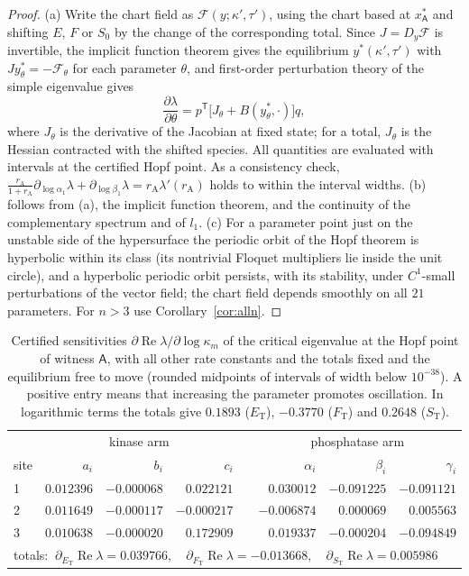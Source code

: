 \documentclass[11pt,a4paper]{article}
\theoremstyle{plain}
\theoremstyle{definition}
\theoremstyle{remark}
\newcommand{\T}{\mathsf T}
\newcommand{\ET}{E_{\mathrm T}}
\newcommand{\FT}{F_{\mathrm T}}
\newcommand{\ST}{S_{\mathrm T}}
\newcommand{\rA}{r_{\mathrm A}}
\newcommand{\WA}{\mathsf A}
\DeclareMathOperator{\Ree}{Re}
\begin{document}
\begin{proof}
(a) Write the chart field as $\mathcal F(y;\kappa',\tau')$, using the chart based at $x^*_{\WA}$ and shifting $E$, $F$ or $S_0$ by the change of the corresponding total. Since $J=D_y\mathcal F$ is invertible, the implicit function theorem gives the equilibrium $y^*(\kappa',\tau')$ with $Jy^*_\theta=-\mathcal F_\theta$ for each parameter $\theta$, and first-order perturbation theory of the simple eigenvalue gives
\begin{equation}\label{eq:dlambda}
 \frac{\partial\lambda}{\partial\theta}=p^{\T}\bigl[J_\theta+B(y^*_\theta,\cdot)\bigr]q ,
\end{equation}
where $J_\theta$ is the derivative of the Jacobian at fixed state; for a total, $J_\theta$ is the Hessian contracted with the shifted species. All quantities are evaluated with intervals at the certified Hopf point. As a consistency check, $\tfrac{\rA}{1+\rA}\partial_{\log\alpha_1}\lambda+\partial_{\log\beta_1}\lambda=\rA\lambda'(\rA)$ holds to within the interval widths.
(b) follows from (a), the implicit function theorem, and the continuity of the complementary spectrum and of $l_1$. (c) For a parameter point just on the unstable side of the hypersurface the periodic orbit of the Hopf theorem is hyperbolic within its class (its nontrivial Floquet multipliers lie inside the unit circle), and a hyperbolic periodic orbit persists, with its stability, under $C^1$-small perturbations of the vector field; the chart field depends smoothly on all $21$ parameters. For $n>3$ use Corollary~\ref{cor:alln}.
\end{proof}

\begin{table}[htbp]
\centering
\begin{tabular}{l@{\quad}rrr@{\qquad}l@{\quad}rrr}
\toprule
 & \multicolumn{3}{c}{kinase arm} & & \multicolumn{3}{c}{phosphatase arm}\\
site & $a_i$ & $b_i$ & $c_i$ & & $\alpha_i$ & $\beta_i$ & $\gamma_i$\\
\midrule
1 & $0.012396$ & $-0.000068$ & $0.022121$ & & $0.030012$ & $-0.091225$ & $-0.091121$\\
2 & $0.011649$ & $-0.000117$ & $-0.000217$ & & $-0.006874$ & $0.000069$ & $0.005563$\\
3 & $0.010638$ & $-0.000020$ & $0.172909$ & & $0.019337$ & $-0.000204$ & $-0.094849$\\
\midrule
\multicolumn{8}{l}{totals: $\ \partial_{\ET}\Ree\lambda=0.039766,\quad \partial_{\FT}\Ree\lambda=-0.013668,\quad \partial_{\ST}\Ree\lambda=0.005986$}\\
\bottomrule
\end{tabular}
\caption{Certified sensitivities $\partial\Ree\lambda/\partial\log\kappa_m$ of the critical eigenvalue at the Hopf point of witness $\WA$, with all other rate constants and the totals fixed and the equilibrium free to move (rounded midpoints of intervals of width below $10^{-38}$). A positive entry means that increasing the parameter promotes oscillation. In logarithmic terms the totals give $0.1893$ ($\ET$), $-0.3770$ ($\FT$) and $0.2648$ ($\ST$).}
\label{tab:gradient}
\end{table}
\end{document}
